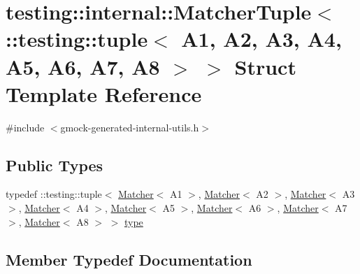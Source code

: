 \hypertarget{structtesting_1_1internal_1_1_matcher_tuple_3_01_1_1testing_1_1tuple_3_01_a1_00_01_a2_00_01_a3_0d8930d50f28e62c202d0bf6b34d01eac}{}\section{testing\+:\+:internal\+:\+:Matcher\+Tuple$<$ \+:\+:testing\+:\+:tuple$<$ A1, A2, A3, A4, A5, A6, A7, A8 $>$ $>$ Struct Template Reference}
\label{structtesting_1_1internal_1_1_matcher_tuple_3_01_1_1testing_1_1tuple_3_01_a1_00_01_a2_00_01_a3_0d8930d50f28e62c202d0bf6b34d01eac}


{\ttfamily \#include $<$gmock-\/generated-\/internal-\/utils.\+h$>$}

\subsection*{Public Types}
\begin{DoxyCompactItemize}
\item 
typedef \+::testing\+::tuple$<$ \hyperlink{classtesting_1_1_matcher}{Matcher}$<$ A1 $>$, \hyperlink{classtesting_1_1_matcher}{Matcher}$<$ A2 $>$, \hyperlink{classtesting_1_1_matcher}{Matcher}$<$ A3 $>$, \hyperlink{classtesting_1_1_matcher}{Matcher}$<$ A4 $>$, \hyperlink{classtesting_1_1_matcher}{Matcher}$<$ A5 $>$, \hyperlink{classtesting_1_1_matcher}{Matcher}$<$ A6 $>$, \hyperlink{classtesting_1_1_matcher}{Matcher}$<$ A7 $>$, \hyperlink{classtesting_1_1_matcher}{Matcher}$<$ A8 $>$ $>$ \hyperlink{structtesting_1_1internal_1_1_matcher_tuple_3_01_1_1testing_1_1tuple_3_01_a1_00_01_a2_00_01_a3_0d8930d50f28e62c202d0bf6b34d01eac_a17186b5ae808ec16b84eb4022ab7a089}{type}
\end{DoxyCompactItemize}


\subsection{Member Typedef Documentation}
